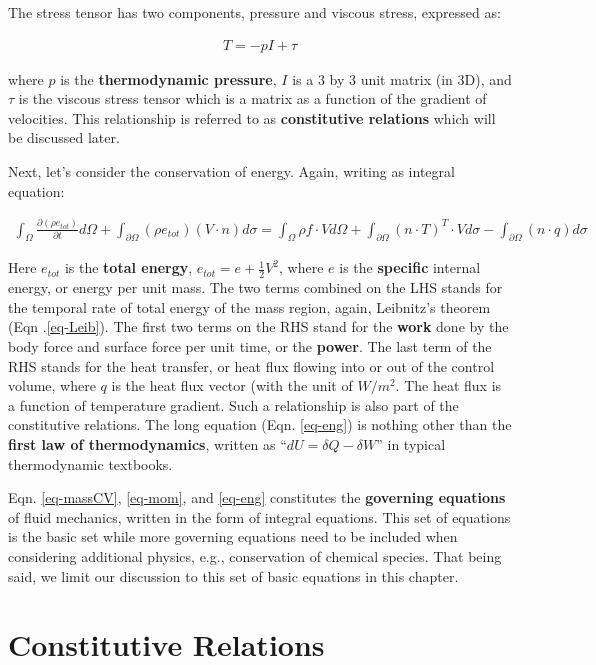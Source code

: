 \documentclass[11pt, letterpaper]{report}
\begin{document}
The stress tensor has two components, pressure and viscous stress, expressed as:

\begin{align*}
   T = -p I + \tau
\end{align*}

where $p$ is the {\bf thermodynamic pressure}, $I$ is a 3 by 3 unit matrix (in 3D), and $\tau$ is the
viscous stress tensor which is a matrix as a function of the gradient of velocities. This
relationship is referred to as {\bf constitutive relations} which will be discussed later.
\paraspace

Next, let's consider the conservation of energy. Again, writing as integral equation:

\begin{align}\label{eq-eng}
   \int_\Omega\frac{\partial(\rho e_{tot})}{\partial t} d\Omega + \int_{\partial\Omega}(\rho
   e_{tot}) (V \cdot n) d\sigma = \int_\Omega \rho f \cdot V d\Omega + \int_{\partial\Omega} (n\cdot
   T)^T \cdot V d\sigma - \int_{\partial\Omega}(n \cdot q) d\sigma
\end{align}

Here $e_{tot}$ is the {\bf total energy}, $e_{tot} = e + \tfrac{1}{2}V^2$, where $e$ is the
{\bf specific} internal energy, or energy per unit mass. The two terms combined on the LHS stands
for the temporal rate of total energy of the mass region, again, Leibnitz's theorem (Eqn
.\ref{eq-Leib}). The first two terms on the RHS stand for the {\bf work} done by the body force and
surface force per unit time, or the {\bf power}. The last term of the RHS stands for the heat
transfer, or heat flux flowing into or out of the control volume, where $q$ is the heat flux vector
(with the unit of $W/m^2$. The heat flux is a function of temperature gradient. Such a relationship
is also part of the constitutive relations. The long equation (Eqn. \ref{eq-eng}) is nothing other
than the {\bf first law of thermodynamics}, written as ``$dU = \delta Q - \delta W$'' in typical
thermodynamic textbooks.
\paraspace

Eqn. \ref{eq-massCV}, \ref{eq-mom}, and \ref{eq-eng} constitutes the {\bf governing equations} of
fluid mechanics, written in the form of integral equations. This set of equations is the basic set
while more governing equations need to be included when considering additional physics, e.g.,
conservation of chemical species. That being said, we limit our discussion to this set of basic
equations in this chapter.
\paraspace

\section{Constitutive Relations}
\end{document}
